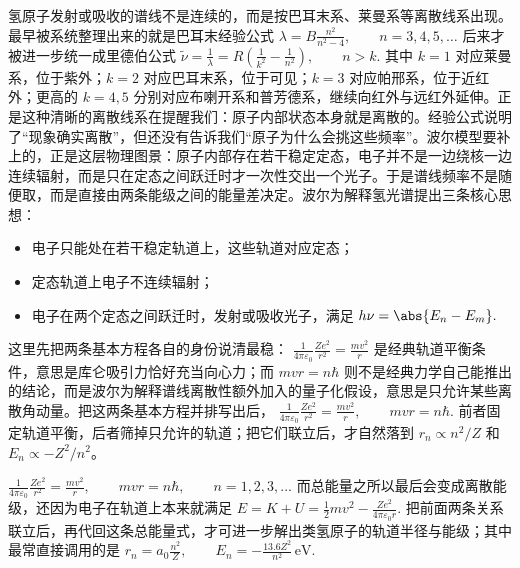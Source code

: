\documentclass[lang=cn,11pt]{elegantbook}
\newcommand{\bridge}[1]{\begin{note}#1\end{note}}
\begin{document}
氢原子发射或吸收的谱线不是连续的，而是按巴耳末系、莱曼系等离散线系出现。最早被系统整理出来的就是巴耳末经验公式
 \(\lambda=B\frac{n^2}{n^2-4}, \qquad n=3,4,5,\dots\) 
后来才被进一步统一成里德伯公式
 \(\tilde{\nu}=\frac{1}{\lambda}=R\left(\frac{1}{k^2}-\frac{1}{n^2}\right), \qquad n>k.\) 
其中 \(k=1\) 对应莱曼系，位于紫外；\(k=2\) 对应巴耳末系，位于可见；\(k=3\) 对应帕邢系，位于近红外；更高的 \(k=4,5\) 分别对应布喇开系和普芳德系，继续向红外与远红外延伸。正是这种清晰的离散线系在提醒我们：原子内部状态本身就是离散的。经验公式说明了“现象确实离散”，但还没有告诉我们“原子为什么会挑这些频率”。波尔模型要补上的，正是这层物理图景：原子内部存在若干稳定定态，电子并不是一边绕核一边连续辐射，而是只在定态之间跃迁时才一次性交出一个光子。于是谱线频率不是随便取，而是直接由两条能级之间的能量差决定。波尔为解释氢光谱提出三条核心思想：
\begin{itemize}
 \item 电子只能处在若干稳定轨道上，这些轨道对应定态；
 \item 定态轨道上电子不连续辐射；
 \item 电子在两个定态之间跃迁时，发射或吸收光子，满足
 \(h\nu=\abs{E_n-E_m}.\) 
\end{itemize}

\bridge{这里先把两条基本方程各自的身份说清最稳：
 \(\frac{1}{4\pi\varepsilon_0}\frac{Ze^2}{r^2}=\frac{mv^2}{r}\) 
是经典轨道平衡条件，意思是库仑吸引力恰好充当向心力；而
 \(mvr=n\hbar\) 
则不是经典力学自己能推出的结论，而是波尔为解释谱线离散性额外加入的量子化假设，意思是只允许某些离散角动量。把这两条基本方程并排写出后，
 \(\frac{1}{4\pi\varepsilon_0}\frac{Ze^2}{r^2}=\frac{mv^2}{r}, \qquad mvr=n\hbar.\) 
前者固定轨道平衡，后者筛掉只允许的轨道；把它们联立后，才自然落到 \(r_n\propto n^2/Z\) 和 \(E_n\propto -Z^2/n^2\)。}
 \(\frac{1}{4\pi\varepsilon_0}\frac{Ze^2}{r^2}=\frac{mv^2}{r}, \qquad mvr=n\hbar, \qquad n=1,2,3,\dots\) 
而总能量之所以最后会变成离散能级，还因为电子在轨道上本来就满足
 \(E=K+U=\frac12 mv^2-\frac{Ze^2}{4\pi\varepsilon_0r}.\) 
把前面两条关系联立后，再代回这条总能量式，才可进一步解出类氢原子的轨道半径与能级；其中最常直接调用的是
 \(r_n=a_0\frac{n^2}{Z}, \qquad E_n=-\frac{13.6Z^2}{n^2}\,\mathrm{eV}.\) 

\begin{center}
\end{center}
\end{document}
